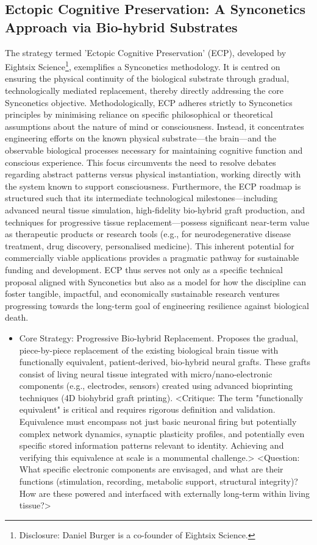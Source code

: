 \documentclass[10pt]{article}
\begin{document}
\begin{sloppypar}
  \subsection{Ectopic Cognitive Preservation: A Synconetics Approach via Bio-hybrid Substrates}
  \label{sec:daniel-approach}

  The strategy termed 'Ectopic Cognitive Preservation' (ECP), developed by Eightsix Science\footnote{Disclosure: Daniel Burger is a co-founder of Eightsix Science.}, exemplifies a Synconetics methodology. It is centred on ensuring the physical continuity of the biological substrate through gradual, technologically mediated replacement, thereby directly addressing the core Synconetics objective. Methodologically, ECP adheres strictly to Synconetics principles by minimising reliance on specific philosophical or theoretical assumptions about the nature of mind or consciousness. Instead, it concentrates engineering efforts on the known physical substrate—the brain—and the observable biological processes necessary for maintaining cognitive function and conscious experience. This focus circumvents the need to resolve debates regarding abstract patterns versus physical instantiation, working directly with the system known to support consciousness. Furthermore, the ECP roadmap is structured such that its intermediate technological milestones—including advanced neural tissue simulation, high-fidelity bio-hybrid graft production, and techniques for progressive tissue replacement—possess significant near-term value as therapeutic products or research tools (e.g., for neurodegenerative disease treatment, drug discovery, personalised medicine). This inherent potential for commercially viable applications provides a pragmatic pathway for sustainable funding and development. ECP thus serves not only as a specific technical proposal aligned with Synconetics but also as a model for how the discipline can foster tangible, impactful, and economically sustainable research ventures progressing towards the long-term goal of engineering resilience against biological death.

  \begin{itemize}
    \item Core Strategy: Progressive Bio-hybrid Replacement. Proposes the gradual, piece-by-piece replacement of the existing biological brain tissue with functionally equivalent, patient-derived, bio-hybrid neural grafts. These grafts consist of living neural tissue integrated with micro/nano-electronic components (e.g., electrodes, sensors) created using advanced bioprinting techniques (4D biohybrid graft printing). <Critique: The term "functionally equivalent" is critical and requires rigorous definition and validation. Equivalence must encompass not just basic neuronal firing but potentially complex network dynamics, synaptic plasticity profiles, and potentially even specific stored information patterns relevant to identity. Achieving and verifying this equivalence at scale is a monumental challenge.> <Question: What specific electronic components are envisaged, and what are their functions (stimulation, recording, metabolic support, structural integrity)? How are these powered and interfaced with externally long-term within living tissue?>


\end{itemize}
\end{sloppypar}
\end{document}
